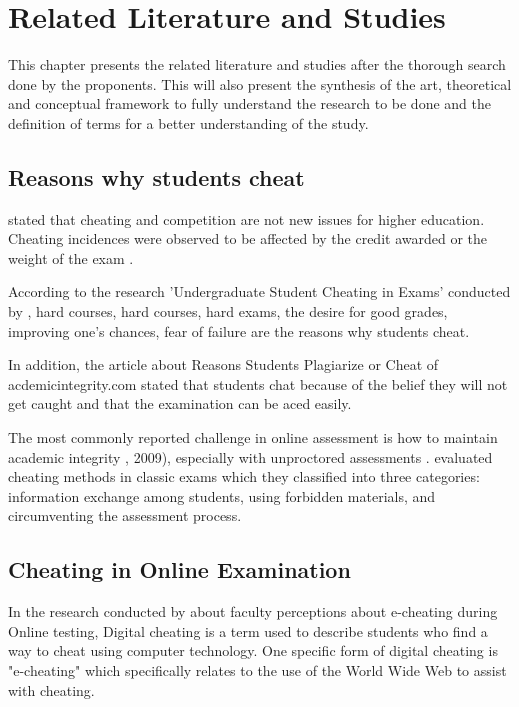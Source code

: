 \chapter{Related Literature and Studies}

This chapter presents the related literature and studies after the thorough search done by the proponents.
This will also present the synthesis of the art, theoretical and conceptual framework to fully understand the research to be done and the definition of terms for a better understanding of the study.

\section*{Reasons why students cheat}

 stated that cheating and competition are not new issues for higher education.
Cheating incidences were observed to be affected by the credit awarded or the weight of the exam \cite{weber1983cheating}.

According to the research 'Undergraduate Student Cheating in Exams' conducted by , hard courses, hard courses, hard exams, the desire for good grades, improving one's chances, fear of failure are the reasons why students cheat.

In addition, the article about Reasons Students Plagiarize or Cheat of acdemicintegrity.com stated that students chat because of the belief they will not get caught and that the examination can be aced easily.

The most commonly reported challenge in online assessment is how to maintain academic integrity \cite{hollister2009proctored}, 2009), especially with unproctored assessments \cite{arnold2016cheating}.
 evaluated cheating methods in classic exams which they classified into three categories: information exchange among students, using forbidden materials, and circumventing the assessment process.

\section*{Cheating in Online Examination}

In the research conducted by  about faculty perceptions about e-cheating during Online testing, Digital cheating is a term used to describe students who find a way to cheat using computer technology.
One specific form of digital cheating is "e-cheating" which specifically relates to the use of the World Wide Web to assist with cheating.

